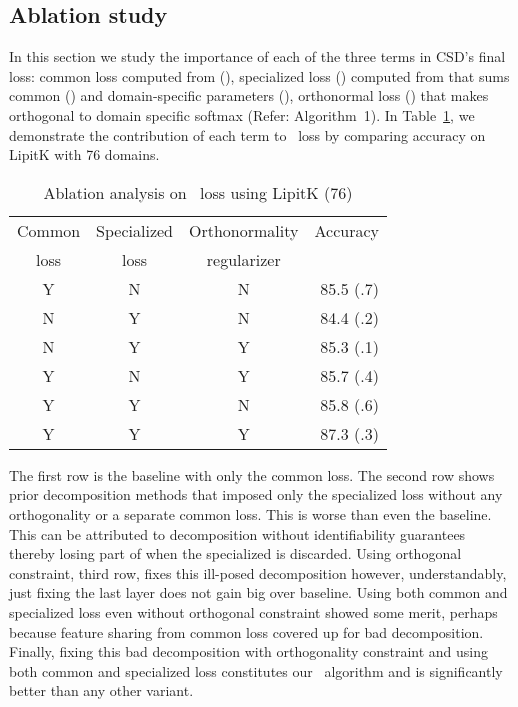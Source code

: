 \documentclass{article}
\begin{document}
\subsection{Ablation study}\label{sec:ablation}

In this section we study the importance of each of the three terms in CSD's final loss: common loss computed from  (), specialized loss  () computed from  that sums common () and domain-specific parameters (), orthonormal loss () that makes  orthogonal to domain specific softmax (Refer: Algorithm~1). In Table~\ref{tab:ablation}, we demonstrate the contribution of each term to \mos\ loss by comparing accuracy on LipitK with 76 domains. 



\begin{table}[htb]
    \centering
    \begin{tabular}{|c|c|c|r|}
    \hline
    Common  & Specialized  & Orthonormality & Accuracy \\
    loss  & loss  & regularizer  &  \\
    \hline
    Y & N & N & 85.5 (.7) \\
    N & Y & N & 84.4 (.2) \\
    N & Y & Y & 85.3 (.1) \\
    Y & N & Y & 85.7 (.4) \\
    Y & Y & N & 85.8 (.6) \\
    Y & Y & Y & 87.3 (.3) \\
    \hline
    \end{tabular}
    \caption{Ablation analysis on \mos\ loss using LipitK (76)}
    \label{tab:ablation}
\end{table}

The first row is the baseline with only the common loss.  The second row shows prior
decomposition methods that imposed only the specialized loss without any orthogonality or a separate common loss. This is worse than even the baseline.  
This can be attributed to decomposition without identifiability guarantees thereby losing part of  when the specialized  is discarded. Using orthogonal constraint, third row, fixes this ill-posed decomposition however, understandably, just fixing the last layer does not gain big over baseline. Using both common and specialized loss even without orthogonal constraint showed some merit, perhaps because feature sharing from common loss covered up for bad decomposition. Finally, fixing this bad decomposition with orthogonality constraint and using both common and specialized loss constitutes our \mos\ algorithm and is significantly better than any other variant.
\end{document}
